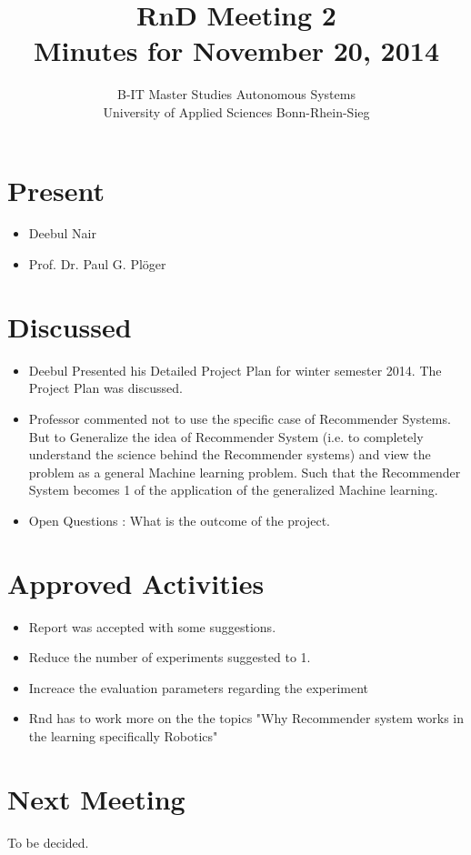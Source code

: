 \documentclass[a4paper]{report}
\title{\textbf{RnD Meeting 2} \\
		Minutes for November 20, 2014}
\author{B-IT Master Studies Autonomous Systems\\
		University of Applied Sciences Bonn-Rhein-Sieg\\
		}
\date{}
\begin{document}
\maketitle

\section{Present}
\begin{itemize}
	\item Deebul Nair
	\item Prof. Dr. Paul G. Pl{\"o}ger
\end{itemize}
\section{Discussed}
\begin{itemize}
	\item Deebul Presented his Detailed Project Plan for winter semester 2014. The Project Plan was discussed.
		\item Professor commented not to use the specific case of Recommender Systems. But to Generalize the idea of Recommender System (i.e. to completely understand the science behind the Recommender systems) and view the problem as a general Machine learning problem. Such that the Recommender System becomes 1 of the application of the generalized Machine learning.
	\item Open Questions : What is the outcome of the project.
\end{itemize}

\section{Approved Activities}
\begin{itemize}
	\item Report was accepted with some suggestions. 
	\item Reduce the number of experiments suggested to 1.
	\item Increace the evaluation parameters regarding the experiment
	\item Rnd has to work more on the the topics "Why Recommender system works in the learning specifically Robotics"
\end{itemize}

\section{Next Meeting}
To be decided.
{}

\end{document}
